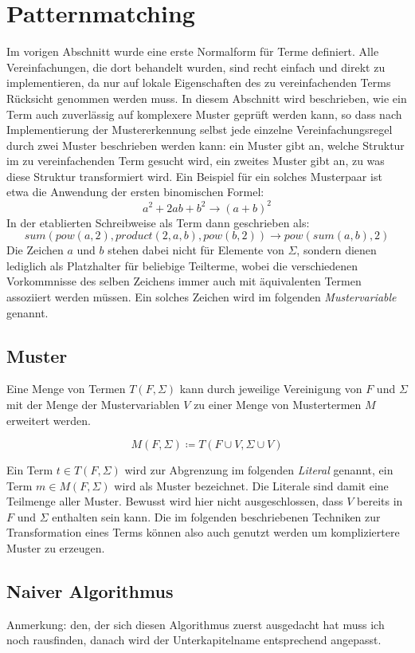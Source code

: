 \documentclass{article}
\begin{document}
\section{Patternmatching}
Im vorigen Abschnitt wurde eine erste Normalform für Terme definiert. Alle Vereinfachungen, die dort behandelt wurden, sind recht einfach und direkt zu implementieren, da nur auf lokale Eigenschaften des zu vereinfachenden Terms Rücksicht genommen werden muss. In diesem Abschnitt wird beschrieben, wie ein Term auch zuverlässig auf komplexere Muster geprüft werden kann, so dass nach Implementierung der Mustererkennung selbst jede einzelne Vereinfachungsregel durch zwei Muster beschrieben werden kann: ein Muster gibt an, welche Struktur im zu vereinfachenden Term gesucht wird, ein zweites Muster gibt an, zu was diese Struktur transformiert wird. Ein Beispiel für ein solches Musterpaar ist etwa die Anwendung der ersten binomischen Formel:
$$a^2 + 2 a b + b^2 \rightarrow (a + b)^2$$
In der etablierten Schreibweise als Term dann geschrieben als:
$$sum(pow(a, 2), product(2, a, b), pow(b, 2)) \rightarrow pow(sum(a, b), 2)$$
Die Zeichen $a$ und $b$ stehen dabei nicht für Elemente von $\Sigma$, sondern dienen lediglich als Platzhalter für beliebige Teilterme, wobei die verschiedenen Vorkommnisse des selben Zeichens immer auch mit äquivalenten Termen assoziiert werden müssen. Ein solches Zeichen wird im folgenden \textit{Mustervariable} genannt.

\subsection{Muster}
Eine Menge von Termen $T(F, \Sigma)$ kann durch jeweilige Vereinigung von $F$ und $\Sigma$ mit der Menge der Mustervariablen $V$ zu einer Menge von Mustertermen $M$ erweitert werden. 

$$M(F, \Sigma) \coloneqq T(F \cup V, \Sigma \cup V)$$

Ein Term $t \in T(F, \Sigma)$ wird zur Abgrenzung im folgenden \textit{Literal} genannt, ein Term $m \in M(F, \Sigma)$ wird als Muster bezeichnet. Die Literale sind damit eine Teilmenge aller Muster. Bewusst wird hier nicht ausgeschlossen, dass $V$ bereits in $F$ und $\Sigma$ enthalten sein kann. Die im folgenden beschriebenen Techniken zur Transformation eines Terms können also auch genutzt werden um kompliziertere Muster zu erzeugen.

\subsection{Naiver Algorithmus}
\begin{itshape}
Anmerkung: den, der sich diesen Algorithmus zuerst ausgedacht hat muss ich noch rausfinden, danach wird der Unterkapitelname entsprechend angepasst.
\end{itshape}
\end{document}
